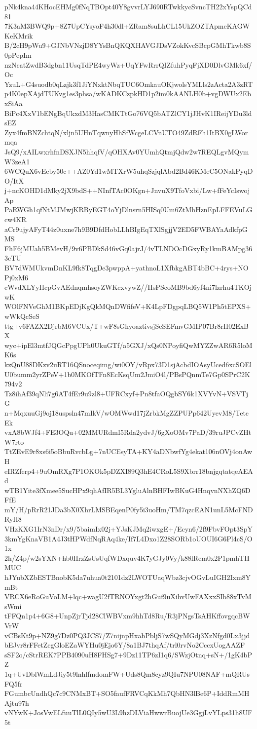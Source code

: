 pNk4kna44KHocEHMg0fNqTBOpt40Y8gvvrLYJ690RTwkkycSvncTH22xYspQCd81
7K3aM3BWQ9p+8Z7UpCYsyoF4h30dl+ZRam8suLhCL15UkZOZTApmeKAGWKeKMrik
B/2cH9pWu9+GJNbVNzjD8YYsBnQKQXHAVGJDsVZokKvcSBcpGMhTkwb8S0pPepIm
nzNcatZwdB3dgbn11UsqTdPE4wyWz+UqYFwRrrQIZfuhPyqFjXD0DlvGMk6xf/Oc
YzuL+G4suodb0qLzjk3f1JiYNxktNbqTUC6OmkauOKjwolsYMLls2zActa2A3zRT
p4K0epXAjdTUKvg1es3phsa/wKADKCzpkHD1p2im0kAANLH0b+vgDWUx2EbxSiAa
BiPc4XxV1bENgBqUkxdM3HasCMKTtGo76VQ5bATZlCY1jJHvK1IReijYDu3ldsEZ
Zyx4fmBNZchtqN/xljn5UHnTqwnyHhSfWcgeLCVnUTO49ZdRFh1ItBX0gLWormqa
JsQ9/xAILwxrhfnDSXJN5hhqfV/qOHXAv0YUmhQtmjQdw2w7REQLgvMQymW3zeA1
6WCQuX6vEeby50c++AZ0Yd1wMTXrW5uhqSzjqlAbd2Bd46KMeC5ONakPyqDO/ItX
j+ncKOHD1dMky2jX9bdS++NInfTAc0OKgn+JnvuX9TfoVxbi/Lw+fFeYcIswojAp
PaRWGh1qfNtMJMwjKRByEGT4oYjDlnsrn5HISq0Um6ZtMhHznEpLFFEVuLGcw4KR
aCr9ujyAFyT44z0uxne7h9B9DfdHobLLhBIgEqTXlSgjjV2ED5FWBAYaAdkfpGMS
FhF6jMUah5BMevH/9v6PBDkSd46vGq0ajrJ/4vTLNDOcDGxyRy1kmBAMpg363cTU
BV7dWMUkvmDnKL9fk8TqgDe3pwppA+yathnoL1XfbkgABT4bBC+4rys+NOPj0xM6
cWvdXLYyHcpGvAEdnqmhsoyZWKcxvywZ//HsPScoMB9bd6yf4ni7lzrhu4TKOjwK
WOlFNVeGhM1BKpEDjKgQkMQnDWfifeV+K4LpFDgpqLBQ5W1Ph5tEPXS+wWkQcSeS
ttg+v6FAZX2DjrbM6VCUx/T+wF8sGhyoaztivsjSeSEFmvGMIP07Br8rII02ExBX
wyc+ipEl3mtfJQGcPpgUPh0UkuGTf/a5GXJ/xQs0NPoyfiQwMYZZwAR6R5loMK6s
kzQnU88DKzv2uRT16QSnoceqimg/wi0OY/vRpx73D1sjAcbdIOAsyUced6xcSOEl
U0bumm2yrZPeV+1b0MKOfTFn8EcKsqUm2JmiO4l/PBsPQnmTe7Gp0SPrC2K794v2
Tz8ihAf39qNli7g6AT4fEr9u9zl8+UFRCxyf+Pn8tfaOQgbSY6k1XVYvN+VSVTjG
n+MqxuuGj9oj18uspsln47mIkV/wOMWwd17jZrbkMgZZPUPp642UyevM8/TetcEk
vxA8bWJf4+FE3OQu+02MMURdmI5Rda2ydvJ/6gXoOMv7PaD/39ruJPCvZHtW7rto
TtZEvE9r8xs6i5oBbuRvcbLg+7nUCEsyTA+KY4aDNbwfYg4ekat106nOVj4onAwH
eIRZferp4+9uOmRXg7P1OKOk5pDZXI89Q3hE4CRoL5S9Xbrr18bnjgqtatqeAEAd
wTB1Yite3fXmee5SucHPx9qhAfIR5BL3YgluAlnBHFIwBKuG4HnqvnNXhZQ6DFfE
mY/H/pRrR21JDa3bX0XhrLMSBEqenP0fy5i3uoHm/TM7qzcEAN1unL5McFNDRyH8
VHzKXG1IrN3nDr/x9/5baimIx02j+YJsKJMq2iwxgE+/Ecyn6/2f9FbvFOpt3SpY
3kmYgKnaVB1A4J3tHPWdfNqRAq4ke/If7L4Dxo1Z28SORb1oUOUI6G6Pl4cS/O1x
2h/Z4p/w2sYXN+hb0HrzZsUsUqfWDxquv4K7yGJy0Vy/k88lRem0x2P1pmhTHMUC
hJYubXZbESTBnobK5da7uhua0t2101dz2LWOTUaqWbz3cjvOGvLuIGH2Ixm8YmBt
VRCX6eRoGuVoLM+lqc+wagU2fTRNOYxgt2hGuf9uXihvUwFAXxxSIb88xTvMsWmi
tFFQn1p4+6G8+UnpZjrTjd28ClWBVxm9hhTd8Ru/R3jPNgsTsAHKffovgqcBWVrW
vCBsKt9p+NZ9g7Dz0PQ3JCS7/Z7nijnpHxabPbljS7wSQyMGdj3XzNfgd0Lx3jjd
bEJvr8rFFetZcgGloEZaWYHu0jEjo6Y/8a1BJ7thqAf/trl0rvNo2CccxUogAAZF
sSF2o/cStrREK7PPB4090uH8FHSg7+9Dz11TP6zI1q6/SWzjOtnq+sN+/1gK4bPZ
1q+UvDblWmLdJiy5t9lnhlfmdomFW+Uds8Qm8cyz9QIu7NPU08NAF+mQRUsFQ5fr
FGumbcUndhQc7c9CNMxBT+SO5faufFRVCqKkMh7QbHN3lBe6P+IddRmMHAjtu97h
vNYwK+JosVwELfuuTlL0QIy5wU3L9hzDLViaHwwrBuojUe3GgjLvYLps31h8UF5t
